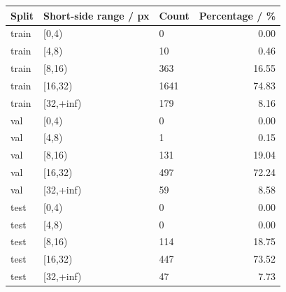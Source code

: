 \begin{tabular}{lllr}
\toprule
Split & Short-side range / px & Count & Percentage / \% \\
\midrule
train & [0,4) & 0 & 0.00 \\
train & [4,8) & 10 & 0.46 \\
train & [8,16) & 363 & 16.55 \\
train & [16,32) & 1641 & 74.83 \\
train & [32,+inf) & 179 & 8.16 \\
val & [0,4) & 0 & 0.00 \\
val & [4,8) & 1 & 0.15 \\
val & [8,16) & 131 & 19.04 \\
val & [16,32) & 497 & 72.24 \\
val & [32,+inf) & 59 & 8.58 \\
test & [0,4) & 0 & 0.00 \\
test & [4,8) & 0 & 0.00 \\
test & [8,16) & 114 & 18.75 \\
test & [16,32) & 447 & 73.52 \\
test & [32,+inf) & 47 & 7.73 \\
\bottomrule
\end{tabular}
